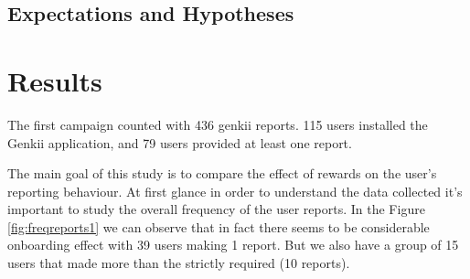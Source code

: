 \documentclass[letterpaper]{article}
\begin{document}
%
%
%
%
%
%

\subsection{Expectations and Hypotheses}


\section{Results}

The first campaign counted with 436 genkii reports.
115 users installed the Genkii application, and 79 users provided at least one report.

The main goal of this study is to compare the effect of rewards on the user's reporting behaviour.
At first glance in order to understand the data collected it's important to study the overall frequency of the user reports. In the Figure \ref{fig:freqreports1} we can observe that in fact there seems to be considerable onboarding effect with 39 users making 1 report. But we also have a group of 15 users that made more than the strictly required (10 reports).
\end{document}
